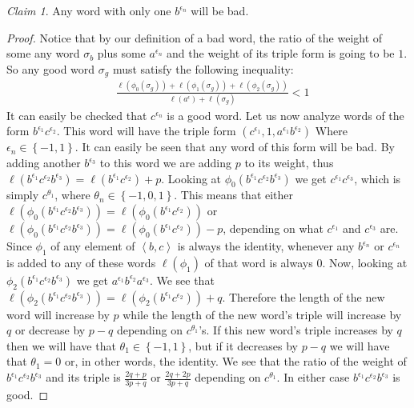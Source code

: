 \documentclass[11pt]{amsart}
\theoremstyle{definition}
\theoremstyle{remark}
\newtheorem{claim}{Claim}
\numberwithin{equation}{section}
\begin{document}
\begin{claim}
Any word with only one $b^{\epsilon_n}$ will be bad.
\end{claim}

\begin{proof}
Notice that by our definition of a bad word, the ratio of the weight of some any word $\sigma_b$ plus some $a^{\epsilon_n}$ and the weight of its triple form is going to be $1$.  So any good word $\sigma_g$ must satisfy the following inequality:   
\begin{align*}
& \frac{\ell(\phi_0(\sigma_g))+\ell(\phi_1(\sigma_g))+\ell(\phi_2(\sigma_g))}{\ell(a^{\epsilon})+\ell(\sigma_g)}<1
\end{align*}
It can easily be checked that $c^{\epsilon_n}$ is a good word.  Let us now analyze words of the form $b^{\epsilon_1}c^{\epsilon_2}$.  This word will have the triple form $(c^{\epsilon_1},1,a^{\epsilon_1}b^{\epsilon_2})$ Where $\epsilon_n\in\left\{-1,1\right\}$.  It can easily be seen that any word of this form will be bad.  By adding another $b^{\epsilon_3}$ to this word we are adding $p$ to its weight, thus $\ell(b^{\epsilon_1}c^{\epsilon_2}b^{\epsilon_3})=\ell(b^{\epsilon_1}c^{\epsilon_2})+p$.  Looking at $\phi_0(b^{\epsilon_1}c^{\epsilon_2}b^{\epsilon_3})$ we get $c^{\epsilon_1}c^{\epsilon_3}$, which is simply $c^{\theta_1}$, where $\theta_n\in\left\{-1,0,1\right\}$.  This means that either $\ell(\phi_0(b^{\epsilon_1}c^{\epsilon_2}b^{\epsilon_3}))=\ell(\phi_0(b^{\epsilon_1}c^{\epsilon_2}))$ or  $\ell(\phi_0(b^{\epsilon_1}c^{\epsilon_2}b^{\epsilon_3}))=\ell(\phi_0(b^{\epsilon_1}c^{\epsilon_2}))-p$, depending on what $c^{\epsilon_1}$ and $c^{\epsilon_3}$ are.  Since $\phi_1$ of any element of $\left\langle b,c\right\rangle$ is always the identity, whenever any $b^{\epsilon_n}$ or $c^{\epsilon_n}$ is added to any of these words $\ell(\phi_1)$ of that word is always $0$.  Now, looking at $\phi_2(b^{\epsilon_1}c^{\epsilon_2}b^{\epsilon_3})$ we get $a^{\epsilon_1}b^{\epsilon_2}a^{\epsilon_3}$. We see that $\ell(\phi_2(b^{\epsilon_1}c^{\epsilon_2}b^{\epsilon_3}))=\ell(\phi_2(b^{\epsilon_1}c^{\epsilon_2}))+q$.  Therefore the length of the new word will increase by $p$ while the length of the new word's triple will increase by $q$ or decrease by $p-q$ depending on $c^{\theta_1}$'s.  If this new word's triple increases by $q$ then we will have that $\theta_1\in\left\{-1,1\right\}$, but if it decreases by $p-q$ we will have that $\theta_1=0$ or, in other words, the identity.  We see that the ratio of the weight of $b^{\epsilon_1}c^{\epsilon_2}b^{\epsilon_3}$ and its triple is $\frac{2q+p}{3p+q}$ or $\frac{2q+2p}{3p+q}$ depending on $c^{\theta_1}$.  In either case $b^{\epsilon_1}c^{\epsilon_2}b^{\epsilon_3}$ is good.


\end{proof}
\end{document}
